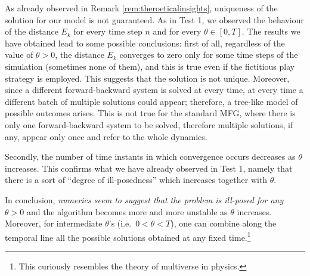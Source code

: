 \documentclass{cmslatex}
\begin{document}
As already observed in Remark \ref{rem:theroeticalinsights}, uniqueness of the solution for our model is not guaranteed.
As in Test 1,  we observed the behaviour of the distance $E_k$ for every time step $n$ and for every $\theta\in[0,T]$.
The results we have obtained lead to some possible conclusions: first of all, regardless of the value of $\theta>0$, the distance $E_k$ converges to zero only for some time steps of the simulation (sometimes none of them), and this is true even if the fictitious play strategy is employed. 
This suggests that the solution is not unique. 
Moreover, since a different forward-backward system is solved at every time, at every time a different batch of multiple solutions could appear; therefore, a tree-like model of possible outcomes arises. 
This is not true for the standard MFG, where there is only one forward-backward system to be solved, therefore multiple solutions, if any, appear only once and refer to the whole dynamics.  

Secondly, the number of time instants in which convergence occurs decreases as $\theta$ increases. This confirms what we have already observed in Test 1, namely that there is a sort of ``degree of ill-posedness'' which increases together with $\theta$.

In conclusion, \emph{numerics seem to suggest that the problem is ill-posed for any $\theta>0$} and the algorithm becomes more and more unstable as $\theta$ increases. 
Moreover, for intermediate $\theta$'s (i.e.\ $0<\theta<T$), one can combine along the temporal line all the possible solutions obtained at any fixed time.\footnote{This curiously resembles the theory of multiverse in physics.} %
%
%
%
\end{document}
